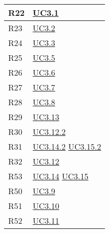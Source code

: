 \begin{longtable}{|P{6cm}|P{6cm}|}
	\hline R22 & \hyperref[UC3.1]{UC3.1} \\
	\hline R23 & \hyperref[UC3.2]{UC3.2} \\
	\hline R24 & \hyperref[UC3.3]{UC3.3} \\
	\hline R25 & \hyperref[UC3.5]{UC3.5} \\
	\hline R26 & \hyperref[UC3.6]{UC3.6} \\
	\hline R27 & \hyperref[UC3.7]{UC3.7} \\
	\hline R28 & \hyperref[UC3.8]{UC3.8} \\
	\hline R29 & \hyperref[UC3.13]{UC3.13} \\
	\hline R30 & \hyperref[UC3.12.2]{UC3.12.2} \\
	\hline R31 & \hyperref[UC3.14.2]{UC3.14.2} \linebreak \hyperref[UC3.15.2]{UC3.15.2} \\
	\hline R32 & \hyperref[UC3.12]{UC3.12} \\
	\hline R53 & \hyperref[UC3.14]{UC3.14} \linebreak \hyperref[UC3.15]{UC3.15} \\
	\hline R50 & \hyperref[UC3.9]{UC3.9} \\
	\hline R51 & \hyperref[UC3.10]{UC3.10} \\
	\hline R52 & \hyperref[UC3.11]{UC3.11} \\	
	\hline
\end{longtable}
